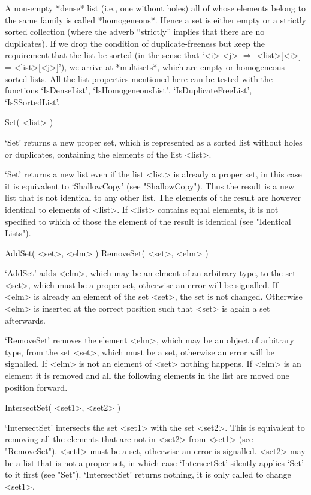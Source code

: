 %
%
%
A non-empty *dense* list (i.e., one without holes)  all of whose elements
belong to the same family is called *homogeneous*. Hence  a set is either
empty  or a  strictly sorted  collection  (where the adverb  ``strictly''
implies  that there   are no duplicates).   If  we drop  the condition of
duplicate-freeness  but keep the requirement  that the list be sorted (in
the  sense that `<i> \<  <j> $\Rightarrow$ <list>[<i>] \<= <list>[<j>]'),
we arrive  at *multisets*, which are  empty or homogeneous  sorted lists.
All  the  list properties mentioned  here  can be  tested with the {\GAP}
functions  `IsDenseList',  `IsHomogeneousList',    `IsDuplicateFreeList',
`IsSSortedList'.

\>Set( <list> )

`Set' returns a  new proper  set, which  is represented as  a sorted list
without holes or duplicates, containing the elements of the list <list>.

`Set' returns a new list even if the list <list> is already a proper set,
in this  case  it is   equivalent to  `ShallowCopy' (see  "ShallowCopy").
Thus the result is  a new list  that is not  identical to any other list.
The elements of  the result are however identical  to elements of <list>.
If <list> contains equal elements, it is  not specified to which of those
the element of the result is identical (see "Identical Lists").

\>AddSet( <set>, <elm> )
\>RemoveSet( <set>, <elm> )

`AddSet' adds <elm>, which may be an elment of an  arbitrary type, to the
set   <set>, which must  be  a proper  set,  otherwise an  error  will be
signalled.  If <elm> is already an element of the  set <set>, the  set is
not  changed.  Otherwise <elm> is inserted  at the  correct position such
that <set> is again a set afterwards.

`RemoveSet' removes   the  element  <elm>,  which  may be   an  object of
arbitrary  type, from the set <set>,  which must be  a  set, otherwise an
error will be signalled.  If  <elm>  is  not an  element of <set> nothing
happens.  If <elm>  is  an element it is removed   and  all the following
elements in the list are moved one position forward.

\>IntersectSet( <set1>, <set2> )

`IntersectSet' intersects  the set <set1> with the  set <set2>.  This  is
equivalent  to removing all  the elements  that are not  in  <set2>  from
<set1> (see  "RemoveSet").  <set1> must be a  set, otherwise  an error is
signalled.  <set2> may be a list that is not a proper  set, in which case
`IntersectSet'   silently  applies  `Set' to      it first  (see  "Set").
`IntersectSet' returns nothing, it is only called to change <set1>.

